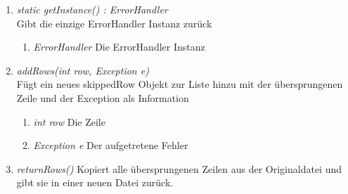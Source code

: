 \begin{enumerate}[+]
	\item \textit{static getInstance() : ErrorHandler} \\ Gibt die einzige ErrorHandler Instanz zurück
\begin{enumerate}[$\circ$]
 	\item \textit{ErrorHandler} Die ErrorHandler Instanz
\end{enumerate}
\item \textit{addRows(int row, Exception e)	}
\\Fügt ein neues skippedRow Objekt zur Liste hinzu mit der übersprungenen Zeile und der Exception als Information 
\begin{enumerate}[$\bullet$]
	\item \textit{int row} Die Zeile
	\item \textit{Exception e} Der aufgetretene Fehler
\end{enumerate}
\item \textit{returnRows()} Kopiert alle übersprungenen Zeilen aus der Originaldatei und gibt sie in einer neuen Datei zurück.
\end{enumerate}

